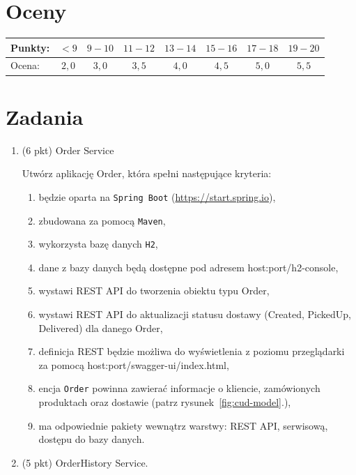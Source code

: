 \documentclass[12pt]{article}
\begin{document}
    \section*{Oceny}
    \begin{tabular}{|l|c|c|c|c|c|c|c|}
        \hline
        Punkty: & $<9$ & $9-10$ & $11-12$ & $13-14$ & $15-16$ & $17-18$ & $19-20$\\
        \hline
        Ocena: & $2,0$ & $3,0$ & $3,5$ & $4,0$ & $4,5$ & $5,0$ & $5,5$\\
        \hline
    \end{tabular}

    \section*{Zadania}
    \begin{enumerate}
        \item\label{exc:order_service}
            (6 pkt) Order Service

            Utwórz aplikację Order, która spełni następujące kryteria:
            \begin{enumerate}
                \item będzie oparta na \texttt{Spring Boot} (\url{https://start.spring.io}),
                \item zbudowana za pomocą \texttt{Maven},
                \item wykorzysta bazę danych \texttt{H2},
                \item dane z bazy danych będą dostępne pod adresem host:port/h2-console,
                \item wystawi REST API do tworzenia obiektu typu Order,
                \item wystawi REST API do aktualizacji statusu dostawy (Created, PickedUp, Delivered) dla danego Order,
                \item definicja REST będzie możliwa do wyświetlenia z poziomu przeglądarki za pomocą host:port/swagger-ui/index.html,
                \item encja \texttt{Order} powinna zawierać informacje o kliencie, zamówionych produktach oraz dostawie (patrz rysunek~\ref{fig:cud-model}.),
                \item ma odpowiednie pakiety wewnątrz warstwy: REST API, serwisową, dostępu do bazy danych.
            \end{enumerate}

        \item\label{exc:order_history_service}
            (5 pkt) OrderHistory Service.


\end{enumerate}
\end{document}
